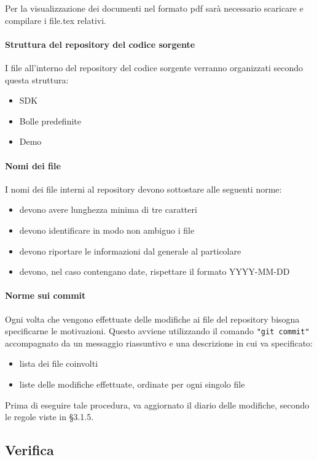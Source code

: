Per la visualizzazione dei documenti nel formato pdf sarà necessario scaricare e compilare i file.tex relativi.


\paragraph{Struttura del repository del codice sorgente}
I file all’interno del repository del codice sorgente verranno organizzati secondo questa struttura:

\begin{itemize}
	\item SDK
	\item Bolle predefinite
	\item Demo
\end{itemize}

\paragraph{Nomi dei file}  
I nomi dei file interni al repository devono sottostare alle seguenti norme:
\begin{itemize}
	\item devono avere lunghezza minima di tre caratteri
	\item devono identificare in modo non ambiguo i file
	\item devono riportare le informazioni dal generale al particolare
	\item devono, nel caso contengano date, rispettare il formato YYYY-MM-DD
\end{itemize}

\paragraph{Norme sui commit}
Ogni volta che vengono effettuate delle modifiche ai file del
repository bisogna specificarne le motivazioni. Questo avviene utilizzando il comando
\texttt{"git commit"} accompagnato da un messaggio riassuntivo e una descrizione in cui va specificato: 
\begin{itemize}
	\item lista dei file coinvolti
	\item liste delle modifiche effettuate, ordinate per ogni singolo file
\end{itemize}
Prima di eseguire tale procedura, va aggiornato il diario delle modifiche, secondo le regole viste in \S 3.1.5.


\subsection{Verifica}


